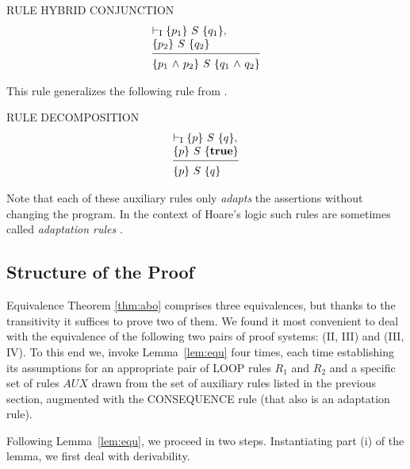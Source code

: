 \documentclass[manuscript, screen, review]{acmart}
\newcommand{\AUX}{\mathit{AUX}}
\begin{document}
\III

\noindent
RULE HYBRID CONJUNCTION
\[
 \begin{array}{l}
  \vdash_{\rm{I}} \HT{p_1}{S}{q_1},   \\
  \HT{p_2}{S}{q_2}                    \\
  [-\medskipamount]
  \hrulefill                          \\
  \HT{p_1 \A p_2}{S}{q_1 \A q_2}
 \end{array}
\]

This rule generalizes the following rule from \cite{ABO09}.
\III

\noindent
RULE DECOMPOSITION
\[
 \begin{array}{l}
  \vdash_{\rm{I}} \HT{p}{S}{q},      \\
  \HT{p}{S}{\T}                      \\
  [-\medskipamount]
  \hrulefill                         \\
  \HT{p}{S}{q}
  \end{array}
\]

\III

Note that each of these auxiliary rules only \emph{adapts} the assertions without changing the program.
In the context of Hoare's logic such rules are sometimes called 
\emph{adaptation rules} \cite{Hoa71,Old83,GR16}.



\subsection{Structure of the Proof}
\label{subsec:structure}

Equivalence Theorem \ref{thm:abo} comprises three equivalences, but
thanks to the transitivity it suffices to prove two of them. We found
it most convenient to deal with the equivalence of the following two
pairs of proof systems: (II, III) and (III, IV). To this end we,
invoke Lemma~\ref{lem:equ} four times, each time establishing its
assumptions for an appropriate pair of LOOP rules $R_1$ and $R_2$ and
a specific set of rules $\AUX$ drawn from the set of auxiliary rules
listed in the previous section, augmented with the CONSEQUENCE rule
(that also is an adaptation rule).

Following Lemma~\ref{lem:equ}, we proceed in two steps.
Instantiating part (i) of the lemma, we first deal with derivability.
\end{document}
